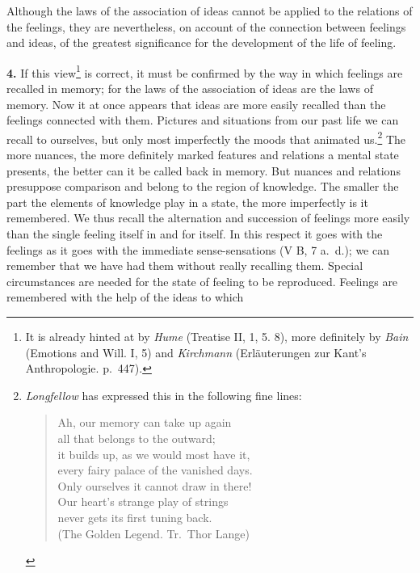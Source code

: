 \documentclass[12pt,a4paper]{book}
\newcommand{\opage}[1]{\marginnote{\footnotesize\textit{[#1]}}}
\begin{document}
Although the laws of the association of ideas cannot be applied to the
relations of the feelings, they are nevertheless, on account of the
connection between feelings and ideas, of the greatest significance for
the development of the life of feeling.

\textbf{4.} If this view\footnote{It is already hinted at by
\emph{Hume} (Treatise II, 1, 5. 8), more definitely by \emph{Bain}
(Emotions and Will. I, 5) and \emph{Kirchmann} (Erläuterungen zur Kant's
Anthropologie. p.~447).} is correct, it must be confirmed by the way in
which feelings are recalled in memory; for the laws of the association
of ideas are the laws of memory.
\opage{291}Now it at once appears that ideas are more easily recalled
than the feelings connected with them. Pictures and situations from our
past life we can recall to ourselves, but only most imperfectly the
moods that animated us.\footnote{\emph{Longfellow} has expressed this in
the following fine lines:
\begin{verse}
Ah, our memory can take up again\\
all that belongs to the outward;\\
it builds up, as we would most have it,\\
every fairy palace of the vanished days.\\
Only ourselves it cannot draw in there!\\
Our heart's strange play of strings\\
never gets its first tuning back.\\
\hspace*{3em}(The Golden Legend. Tr.\ Thor Lange)
\end{verse}}
The more nuances, the more definitely marked features and relations a
mental state presents, the better can it be called back in memory. But
nuances and relations presuppose comparison and belong to the region of
knowledge. The smaller the part the elements of knowledge play in a
state, the more imperfectly is it remembered. We thus recall the
alternation and succession of feelings more easily than the single
feeling itself in and for itself. In this respect it goes with the
feelings as it goes with the immediate sense-sensations (V B, 7 a.\ d.);
we can remember that we have had them without really recalling them.
Special circumstances are needed for the state of feeling to be
reproduced. Feelings are remembered with the help of the ideas to which
\end{document}
